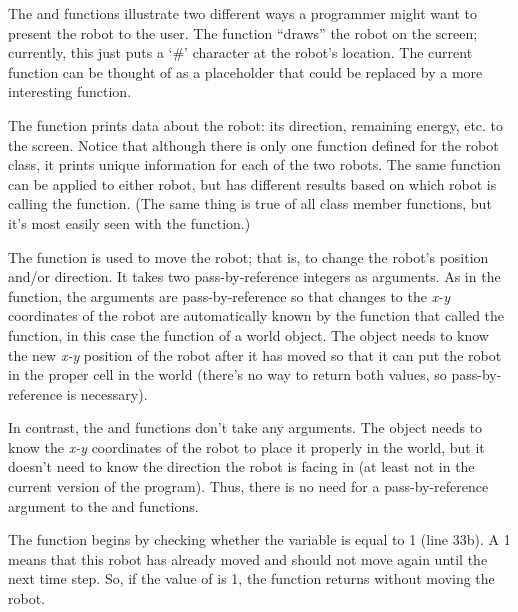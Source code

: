 The  and  functions illustrate two different ways a programmer might want to present the robot to the user.  The  function ``draws'' the robot on the screen; currently, this just puts a `\#' character at the robot's location.  The
current  function can be thought of as a placeholder that could be replaced by a  more interesting function.

 The  function prints data about the robot: its direction, remaining energy, etc. to the screen.  Notice that although there is only one  function defined for the robot class, it prints unique information for each of the two robots.  The same function can be applied to either robot, but has different results based on which robot is calling the function.   (The same thing is true of all class member functions, but it's most easily seen with the  function.)


The  function is used to move the robot; that is, to change the robot's position and/or direction.  It takes two pass-by-reference integers as arguments.   As in the  function, the arguments are pass-by-reference so that changes to the \emph{x-y} coordinates of the robot are automatically known by the function that called the  function, in this case the  function of a world object.  The  object needs to know the new \emph{x-y} position of the robot after it has moved so that it can put the robot in the proper cell in the world (there's no way to return both values, so pass-by-reference is necessary).  

In contrast, the  and  functions don't take any arguments.  The  object needs to know the \emph{x-y} coordinates of the robot to place it properly in the world, but it doesn't need to know the direction the robot is facing in (at least not in the current version of the program).  Thus,  there is no need for a pass-by-reference argument to the  and  functions.  

The  function begins by checking whether the  variable is equal to 1 (line 33b).  A 1 means that this robot has already moved and should not move again until the next time step.  So, if the value of  is 1, the function returns without moving the robot.  


